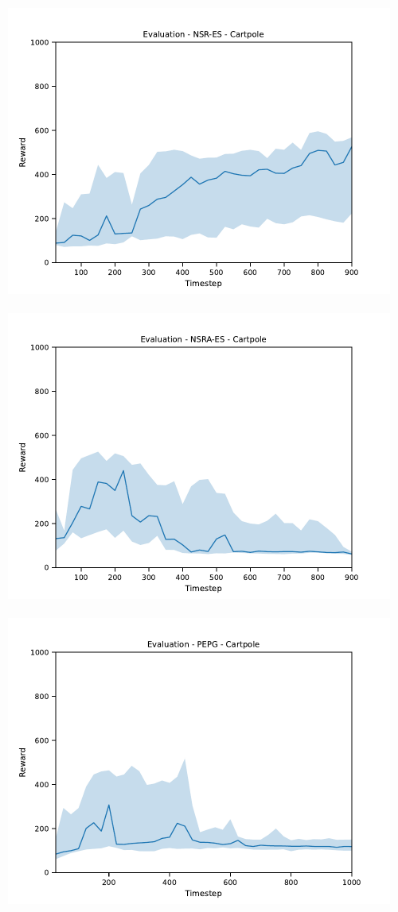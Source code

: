\begin{figure}[H]
    \includegraphics[width=0.9\textwidth]{img/eval-cart-nsres.pdf}
\end{figure}
\begin{figure}[H]
    \includegraphics[width=0.9\textwidth]{img/eval-cart-nsraes.pdf}
\end{figure}
\begin{figure}[H]
    \includegraphics[width=0.9\textwidth]{img/eval-cart-pepg.pdf}
\end{figure}
